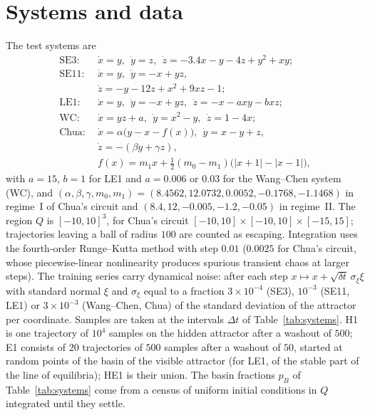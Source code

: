 \section{Systems and data}
\label{app:systems}

The test systems are\cite{Molaie2013,JafariSprott2013,WangChen2012,Leonov2011PLA,Stankevich2017}
\begin{align*}
\text{SE3:}\ \ &\dot x=y,\ \ \dot y=z,\ \ \dot z=-3.4x-y-4z+y^2+xy;\\
\text{SE11:}\ \ &\dot x=y,\ \ \dot y=-x+yz,\\
&\dot z=-y-12z+x^2+9xz-1;\\
\text{LE1:}\ \ &\dot x=y,\ \ \dot y=-x+yz,\ \ \dot z=-x-axy-bxz;\\
\text{WC:}\ \ &\dot x=yz+a,\ \ \dot y=x^2-y,\ \ \dot z=1-4x;\\
\text{Chua:}\ \ &\dot x=\alpha\bigl(y-x-f(x)\bigr),\ \ \dot y=x-y+z,\\
&\dot z=-(\beta y+\gamma z),\\
&f(x)=m_1x+\tfrac12(m_0-m_1)\bigl(|x+1|-|x-1|\bigr),
\end{align*}
with $a=15$, $b=1$ for LE1 and $a=0.006$ or $0.03$ for the Wang--Chen system (WC), and
$(\alpha,\beta,\gamma,m_0,m_1)=(8.4562,12.0732,0.0052,-0.1768,-1.1468)$ in regime~I of Chua's circuit and
$(8.4,12,-0.005,-1.2,-0.05)$ in regime~II. The region $Q$ is $[-10,10]^3$, for Chua's circuit
$[-10,10]\times[-10,10]\times[-15,15]$; trajectories leaving a ball of radius $100$ are counted as escaping. Integration uses
the fourth-order Runge--Kutta method with step $0.01$ ($0.0025$ for Chua's circuit, whose piecewise-linear nonlinearity
produces spurious transient chaos at larger steps). The training series carry dynamical noise: after each step
$x\mapsto x+\sqrt{\delta t}\,\sigma_\xi\xi$ with standard normal $\xi$ and $\sigma_\xi$ equal to a fraction $3\times10^{-4}$ (SE3),
$10^{-3}$ (SE11, LE1) or $3\times10^{-3}$ (Wang--Chen, Chua) of the standard deviation of the attractor per coordinate.
Samples are taken at the intervals $\Delta t$ of Table~\ref{tab:systems}. H1 is one trajectory of $10^4$ samples on the
hidden attractor after a washout of $500$; E1 consists of $20$ trajectories of $500$ samples after a washout of $50$,
started at random points of the basin of the visible attractor (for LE1, of the stable part of the line of equilibria);
HE1 is their union. The basin fractions $p_B$ of Table~\ref{tab:systems} come from a census of uniform initial conditions in
$Q$ integrated until they settle.

